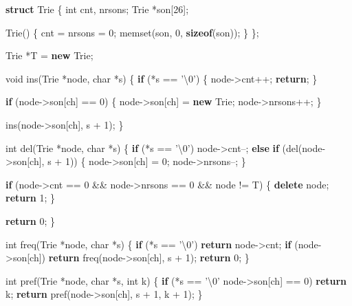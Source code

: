 \documentclass[10pt,]{article}
\newenvironment{Shaded}{}{}
\newcommand{\KeywordTok}[1]{\textcolor[rgb]{0.00,0.44,0.13}{\textbf{{#1}}}}
\newcommand{\DataTypeTok}[1]{\textcolor[rgb]{0.56,0.13,0.00}{{#1}}}
\newcommand{\DecValTok}[1]{\textcolor[rgb]{0.25,0.63,0.44}{{#1}}}
\newcommand{\NormalTok}[1]{{#1}}
\begin{document}
\begin{Shaded}
\begin{Highlighting}[]
\KeywordTok{struct} \NormalTok{Trie \{}
  \DataTypeTok{int} \NormalTok{cnt, nrsons;}
  \NormalTok{Trie *son[}\DecValTok{26}\NormalTok{];}

  \NormalTok{Trie() \{}
    \NormalTok{cnt = nrsons = }\DecValTok{0}\NormalTok{;}
    \NormalTok{memset(son, }\DecValTok{0}\NormalTok{, }\KeywordTok{sizeof}\NormalTok{(son));}
  \NormalTok{\}}
\NormalTok{\};}

\NormalTok{Trie *T = }\KeywordTok{new} \NormalTok{Trie;}

\DataTypeTok{void} \NormalTok{ins(Trie *node, }\DataTypeTok{char} \NormalTok{*s)}
\NormalTok{\{}
  \KeywordTok{if} \NormalTok{(*s == '\textbackslash{}}\DecValTok{0}\NormalTok{') \{}
    \NormalTok{node->cnt++;}
    \KeywordTok{return}\NormalTok{;}
  \NormalTok{\}}

  \KeywordTok{if} \NormalTok{(node->son[ch] == }\DecValTok{0}\NormalTok{) \{}
    \NormalTok{node->son[ch] = }\KeywordTok{new} \NormalTok{Trie;}
    \NormalTok{node->nrsons++;}
  \NormalTok{\}}

  \NormalTok{ins(node->son[ch], s + }\DecValTok{1}\NormalTok{);}
\NormalTok{\}}

\DataTypeTok{int} \NormalTok{del(Trie *node, }\DataTypeTok{char} \NormalTok{*s)}
\NormalTok{\{}
  \KeywordTok{if} \NormalTok{(*s == '\textbackslash{}}\DecValTok{0}\NormalTok{')}
    \NormalTok{node->cnt--;}
  \KeywordTok{else} \KeywordTok{if} \NormalTok{(del(node->son[ch], s + }\DecValTok{1}\NormalTok{)) \{}
    \NormalTok{node->son[ch] = }\DecValTok{0}\NormalTok{;}
    \NormalTok{node->nrsons--;}
  \NormalTok{\}}

  \KeywordTok{if} \NormalTok{(node->cnt == }\DecValTok{0} \NormalTok{&& node->nrsons == }\DecValTok{0} \NormalTok{&& node != T) \{}
    \KeywordTok{delete} \NormalTok{node;}
    \KeywordTok{return} \DecValTok{1}\NormalTok{;}
  \NormalTok{\}}

  \KeywordTok{return} \DecValTok{0}\NormalTok{;}
\NormalTok{\}}

\DataTypeTok{int} \NormalTok{freq(Trie *node, }\DataTypeTok{char} \NormalTok{*s)}
\NormalTok{\{}
  \KeywordTok{if} \NormalTok{(*s == '\textbackslash{}}\DecValTok{0}\NormalTok{')}
    \KeywordTok{return} \NormalTok{node->cnt;}
  \KeywordTok{if} \NormalTok{(node->son[ch])}
    \KeywordTok{return} \NormalTok{freq(node->son[ch], s + }\DecValTok{1}\NormalTok{);}
  \KeywordTok{return} \DecValTok{0}\NormalTok{;}
\NormalTok{\}}

\DataTypeTok{int} \NormalTok{pref(Trie *node, }\DataTypeTok{char} \NormalTok{*s, }\DataTypeTok{int} \NormalTok{k)}
\NormalTok{\{}
  \KeywordTok{if} \NormalTok{(*s == '\textbackslash{}}\DecValTok{0}\NormalTok{' \textbar{}\textbar{} node->son[ch] == }\DecValTok{0}\NormalTok{)}
    \KeywordTok{return} \NormalTok{k;}
  \KeywordTok{return} \NormalTok{pref(node->son[ch], s + }\DecValTok{1}\NormalTok{, k + }\DecValTok{1}\NormalTok{);}
\NormalTok{\}}
\end{Highlighting}
\end{Shaded}
\end{document}
